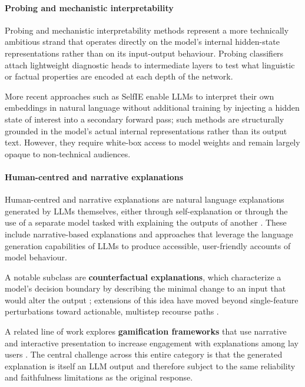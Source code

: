 \paragraph{Probing and mechanistic interpretability}
Probing and mechanistic interpretability methods represent a more technically ambitious strand that operates directly on the model's internal hidden-state representations rather than on its input-output behaviour. Probing classifiers attach lightweight diagnostic heads to intermediate layers to test what linguistic or factual properties are encoded at each depth of the network. 

More recent approaches such as SelfIE \cite{chen_selfie_2024} enable LLMs to interpret their own embeddings in natural language without additional training by injecting a hidden state of interest into a secondary forward pass; such methods are structurally grounded in the model's actual internal representations rather than its output text. However, they require white-box access to model weights and remain largely opaque to non-technical audiences.

\paragraph{Human-centred and narrative explanations}
Human-centred and narrative explanations are natural language explanations generated by LLMs themselves, either through self-explanation or through the use of a separate model tasked with explaining the outputs of another \cite{bilal_llms_2025}. These include narrative-based explanations and approaches that leverage the language generation capabilities of LLMs to produce accessible, user-friendly accounts of model behaviour. 

A notable subclass are \textbf{counterfactual explanations}, which characterize a model's decision boundary by describing the minimal change to an input that would alter the output \cite{wachter_counterfactual_2018}; extensions of this idea have moved beyond single-feature perturbations toward actionable, multistep recourse paths \cite{rawal_beyond_2020}. 

A related line of work explores \textbf{gamification frameworks} that use narrative and interactive presentation to increase engagement with explanations among lay users \cite{you_gamifying_2024}. The central challenge across this entire category is that the generated explanation is itself an LLM output and therefore subject to the same reliability and faithfulness limitations as the original response.

